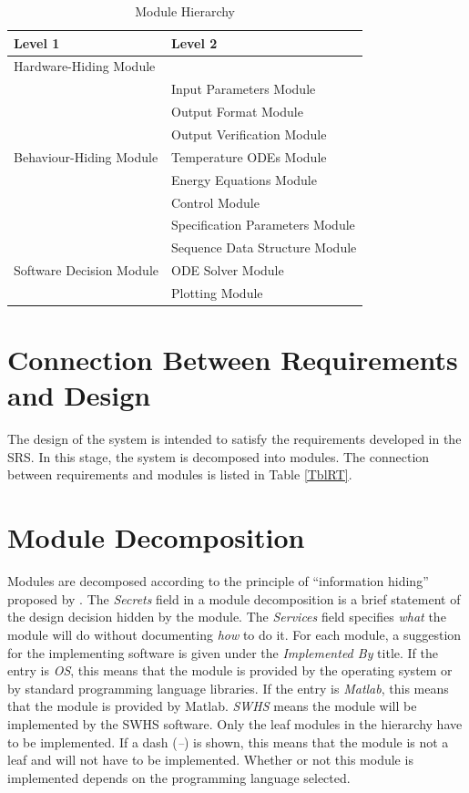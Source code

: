 \documentclass[12pt]{article}
\begin{document}
\begin{table}[h!]
\centering
\begin{tabular}{p{} p{}}
\toprule
\textbf{Level 1} & \textbf{Level 2}\\
\midrule

{Hardware-Hiding Module} & ~ \\
\midrule

\multirow{7}{0.3\textwidth}{Behaviour-Hiding Module} & Input Parameters Module\\
& Output Format Module\\
& Output Verification Module\\
& Temperature ODEs Module\\
& Energy Equations Module\\ 
& Control Module\\
& Specification Parameters Module\\
\midrule

\multirow{3}{0.3\textwidth}{Software Decision Module} & {Sequence Data Structure Module}\\
& ODE Solver Module\\
& Plotting Module\\
\bottomrule

\end{tabular}
\caption{Module Hierarchy}
\label{TblMH}
\end{table}

\section{Connection Between Requirements and Design} \label{SecConnection}

The design of the system is intended to satisfy the requirements developed in
the SRS. In this stage, the system is decomposed into modules. The connection
between requirements and modules is listed in Table \ref{TblRT}.

\section{Module Decomposition} \label{SecMD}

Modules are decomposed according to the principle of ``information hiding''
proposed by \citet{ParnasEtAl1984}. The \emph{Secrets} field in a module
decomposition is a brief statement of the design decision hidden by the
module. The \emph{Services} field specifies \emph{what} the module will do
without documenting \emph{how} to do it. For each module, a suggestion for the
implementing software is given under the \emph{Implemented By} title. If the
entry is \emph{OS}, this means that the module is provided by the operating
system or by standard programming language libraries. If the entry is
\emph{Matlab}, this means that the module is provided by Matlab.  \emph{SWHS} means the
module will be implemented by the SWHS software.  
Only the leaf modules in the
hierarchy have to be implemented. If a dash (\emph{--}) is shown, this means
that the module is not a leaf and will not have to be implemented. Whether or
not this module is implemented depends on the programming language
selected.
\end{document}
